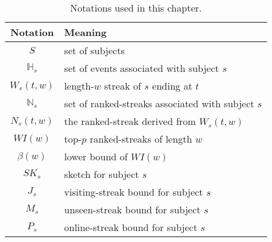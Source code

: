 \begin{table}[h]
\caption{Notations used in this chapter.}
\centering
\begin{tabular}{|c|l|}  
\hline 
\textbf{Notation} & \textbf{Meaning} \\ 
\hline
$S$ & set of subjects \\
\hline
$\mathbb{H}_s$ & set of events associated with subject $s$\\
\hline
$W_s(t,w)$ & length-$w$ streak of $s$ ending at $t$\\
\hline
$\mathbb{N}_s$ & set of ranked-streaks associated with subject $s$\\
\hline 
$N_s(t, w)$ & the ranked-streak derived from $W_s(t,w)$ \\ 
\hline 
$WI(w)$ & top-$p$ ranked-streaks of length $w$\\
\hline
$\beta(w)$ & lower bound of $WI(w)$\\
\hline
$SK_s$ & sketch for subject $s$ \\
\hline
$J_s$ & visiting-streak bound for subject $s$ \\
\hline
$M_s$ & unseen-streak bound for subject $s$\\
\hline
$P_s$ & online-streak bound for subject $s$\\
\hline
\end{tabular} 
\label{tbl:notations}
\end{table}
